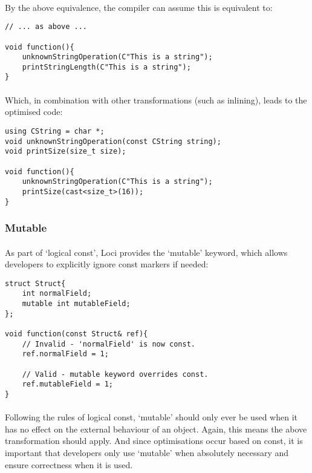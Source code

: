 \documentclass[12pt,twoside,notitlepage]{report}
\begin{document}
\paragraph{}
By the above equivalence, the compiler can assume this is equivalent to:

\begin{lstlisting}
// ... as above ...

void function(){
	unknownStringOperation(C"This is a string");
	printStringLength(C"This is a string");
}
\end{lstlisting}

\paragraph{}
Which, in combination with other transformations (such as inlining), leads to the optimised code:

\begin{lstlisting}
using CString = char *;
void unknownStringOperation(const CString string);
void printSize(size_t size);

void function(){
	unknownStringOperation(C"This is a string");
	printSize(cast<size_t>(16));
}
\end{lstlisting}

\subsubsection{Mutable}

\paragraph{}
As part of `logical const', Loci provides the `mutable' keyword, which allows developers to explicitly ignore const markers if needed:

\begin{lstlisting}
struct Struct{
	int normalField;
	mutable int mutableField;
};

void function(const Struct& ref){
	// Invalid - 'normalField' is now const.
	ref.normalField = 1;
	
	// Valid - mutable keyword overrides const.
	ref.mutableField = 1;
}
\end{lstlisting}

\paragraph{}
Following the rules of logical const, `mutable' should only ever be used when it has no effect on the external behaviour of an object. Again, this means the above transformation should apply. And since optimisations occur based on const, it is important that developers only use `mutable' when absolutely necessary and ensure correctness when it is used.
\end{document}

